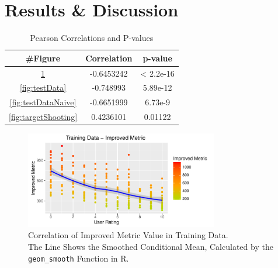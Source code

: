 \documentclass{sig-alternate-05-2015}
\begin{document}
\section{Results \& Discussion}

\begin{table}[b]
\centering
\begin{tabular}{|c|c|c|} \hline
\#Figure & Correlation & p-value\\ \hline
\ref{fig:trainingData} & -0.6453242 & < 2.2e-16\\ \hline
\ref{fig:testData} & -0.748993 & 5.89e-12\\ \hline
\ref{fig:testDataNaive} & -0.6651999 & 6.73e-9\\ \hline
\ref{fig:targetShooting} & 0.4236101 & 0.01122\\ \hline
\end{tabular}
\caption{Pearson Correlations and P-values}
\label{tab:correlations}
\end{table}

\begin{figure}[b]
\centering
\includegraphics[width=8.45cm]{TrainingDataImproved}
\vspace{-20pt}
\caption{Correlation of Improved Metric Value in Training Data. \\
The Line Shows the Smoothed Conditional Mean, Calculated by the \texttt{geom\_smooth} Function in R.}
\label{fig:trainingData}
\vspace{-10pt}
\end{figure}
\end{document}
